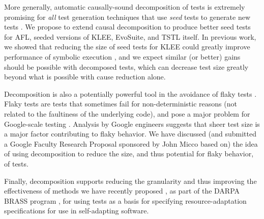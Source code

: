 More generally, automatic causally-sound decomposition of tests is extremely promising for \emph{all}
test generation techniques that use \emph{seed} tests to generate new
tests \cite{seededprovenance}.  We propose to extend
causal decomposition to produce better seed tests for AFL,
seeded versions of KLEE, EvoSuite, and TSTL itself.  In previous work, we showed that reducing the
size of seed tests for KLEE could greatly improve performance of
symbolic execution \cite{issta14,stvrcausereduce}, and we expect
similar (or better) gains should be possible with decomposed tests,
which can decrease test size greatly beyond what is possible with
cause reduction alone.  

Decomposition is also a potentially powerful tool in the
avoidance of flaky tests
\cite{miccoflaky,palomba2017does,luo2014empirical}.  Flaky tests are
tests that sometimes fail for non-deterministic reasons (not related
to the faultiness of the underlying code), and pose a major problem
for Google-scale testing \cite{miccoflaky,memon2017taming}.  Analysis
by Google engineers suggests that sheer test size
\cite{listfieldtestanalysis} is a major factor contributing to flaky
behavior.  We have discussed (and submitted a Google Faculty Research
Proposal sponsored by John Micco based on) the idea of using
decomposition to reduce the size, and thus potential for flaky
behavior, of tests.

Finally, decomposition supports reducing the granularity and thus
improving the effectiveness of methods
we have recently proposed \cite{SASO}, as part of the DARPA BRASS
program \cite{hughes2016building}, for using tests as a basis for
specifying resource-adaptation specifications for use in self-adapting software.

